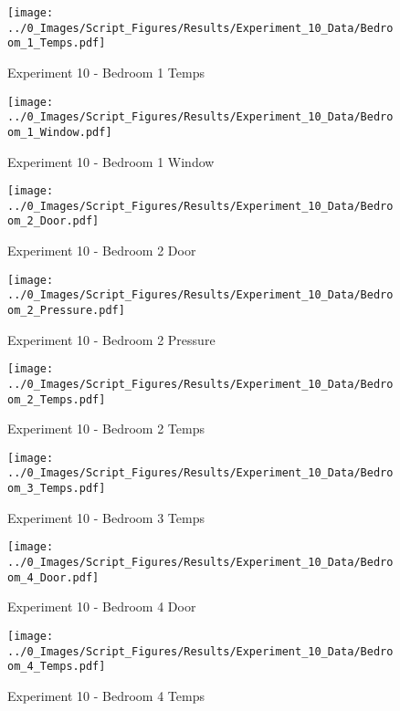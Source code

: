 	\begin{figure}[H]
		\centering
		\texttt{[image: ../0\_Images/Script\_Figures/Results/Experiment\_10\_Data/Bedroom\_1\_Temps.pdf]}
		\caption[]{Experiment 10 - Bedroom 1 Temps}
	\end{figure}
 
	\clearpage

	\begin{figure}[H]
		\centering
		\texttt{[image: ../0\_Images/Script\_Figures/Results/Experiment\_10\_Data/Bedroom\_1\_Window.pdf]}
		\caption[]{Experiment 10 - Bedroom 1 Window}
	\end{figure}
 

	\begin{figure}[H]
		\centering
		\texttt{[image: ../0\_Images/Script\_Figures/Results/Experiment\_10\_Data/Bedroom\_2\_Door.pdf]}
		\caption[]{Experiment 10 - Bedroom 2 Door}
	\end{figure}
 
	\clearpage

	\begin{figure}[H]
		\centering
		\texttt{[image: ../0\_Images/Script\_Figures/Results/Experiment\_10\_Data/Bedroom\_2\_Pressure.pdf]}
		\caption[]{Experiment 10 - Bedroom 2 Pressure}
	\end{figure}
 

	\begin{figure}[H]
		\centering
		\texttt{[image: ../0\_Images/Script\_Figures/Results/Experiment\_10\_Data/Bedroom\_2\_Temps.pdf]}
		\caption[]{Experiment 10 - Bedroom 2 Temps}
	\end{figure}
 
	\clearpage

	\begin{figure}[H]
		\centering
		\texttt{[image: ../0\_Images/Script\_Figures/Results/Experiment\_10\_Data/Bedroom\_3\_Temps.pdf]}
		\caption[]{Experiment 10 - Bedroom 3 Temps}
	\end{figure}
 

	\begin{figure}[H]
		\centering
		\texttt{[image: ../0\_Images/Script\_Figures/Results/Experiment\_10\_Data/Bedroom\_4\_Door.pdf]}
		\caption[]{Experiment 10 - Bedroom 4 Door}
	\end{figure}
 
	\clearpage

	\begin{figure}[H]
		\centering
		\texttt{[image: ../0\_Images/Script\_Figures/Results/Experiment\_10\_Data/Bedroom\_4\_Temps.pdf]}
		\caption[]{Experiment 10 - Bedroom 4 Temps}
	\end{figure}
 

